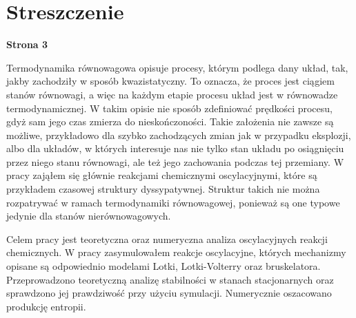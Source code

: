 \documentclass[10pt, a4paper, twoside, onecolumn]{article}
\numberwithin{equation}{section}
\begin{document}
	\section*{Streszczenie}
	\begin{center}
		\textbf{Strona 3}
	\end{center}
	Termodynamika równowagowa opisuje procesy, którym podlega dany układ, tak, jakby zachodziły w sposób kwazistatyczny. To oznacza, że proces jest ciągiem stanów równowagi, a więc na każdym etapie procesu układ jest w równowadze termodynamicznej. W takim opisie nie sposób zdefiniować prędkości procesu, gdyż sam jego czas zmierza do nieskończoności. Takie założenia nie zawsze są możliwe, przykładowo dla szybko zachodzących zmian jak w przypadku eksplozji, albo dla układów, w których interesuje nas nie tylko stan układu po osiągnięciu przez niego stanu równowagi, ale też jego zachowania podczas tej przemiany. W pracy zająłem się głównie reakcjami chemicznymi oscylacyjnymi, które są przykładem czasowej struktury dyssypatywnej. Struktur takich nie można rozpatrywać w ramach termodynamiki równowagowej, ponieważ są one typowe jedynie dla stanów nierównowagowych. \par
	Celem pracy jest teoretyczna oraz numeryczna analiza oscylacyjnych reakcji chemicznych. W pracy zasymulowałem reakcje oscylacyjne, których mechanizmy opisane są odpowiednio modelami Lotki, Lotki-Volterry oraz bruskelatora. Przeprowadzono teoretyczną analizę stabilności w stanach stacjonarnych oraz sprawdzono jej prawdziwość przy użyciu symulacji. Numerycznie oszacowano produkcję entropii. 
	
	
	\pagebreak
	
\end{document}
